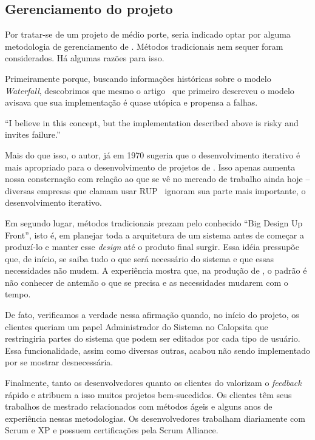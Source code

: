 \subsection{Gerenciamento do projeto}

Por tratar-se de um projeto de médio porte, seria indicado optar por alguma metodologia de gerenciamento de \software. Métodos tradicionais nem sequer foram considerados. Há algumas razões para isso.

Primeiramente porque, buscando informações históricas sobre o modelo \textit{Waterfall}, descobrimos que mesmo o artigo~\cite{waterfall} que primeiro descreveu o modelo avisava que sua implementação é quase utópica e propensa a falhas.

``I believe in this concept, but the implementation described above is risky and invites failure.''

Mais do que isso, o autor, já em 1970 sugeria que o desenvolvimento iterativo é mais apropriado para o desenvolvimento de projetos de \software. Isso apenas aumenta nossa consternação com relação ao que se vê no mercado de trabalho ainda hoje -- diversas empresas que clamam usar RUP~\cite{rup} ignoram sua parte mais importante, o desenvolvimento iterativo.

Em segundo lugar, métodos tradicionais prezam pelo conhecido ``Big Design Up Front'', isto é, em planejar toda a arquitetura de um sistema antes de começar a produzí-lo e manter esse \textit{design} até o produto final surgir. Essa idéia pressupõe que, de início, se saiba tudo o que será necessário do sistema e que essas necessidades não mudem. A experiência mostra que, na produção de \software, o padrão é não conhecer de antemão o que se precisa e as necessidades mudarem com o tempo.

De fato, verificamos a verdade nessa afirmação quando, no início do projeto, os clientes queriam um papel Administrador do Sistema no Calopsita que restringiria partes do sistema que podem ser editados por cada tipo de usuário. Essa funcionalidade, assim como diversas outras, acabou não sendo implementado por se mostrar desnecessária.

Finalmente, tanto os desenvolvedores quanto os clientes do \calopsita valorizam o \textit{feedback} rápido e atribuem a isso muitos projetos bem-sucedidos. Os clientes têm seus trabalhos de mestrado relacionados com métodos ágeis e alguns anos de experiência nessas metodologias. Os desenvolvedores trabalham diariamente com Scrum e XP e possuem certificações pela Scrum Alliance. 

